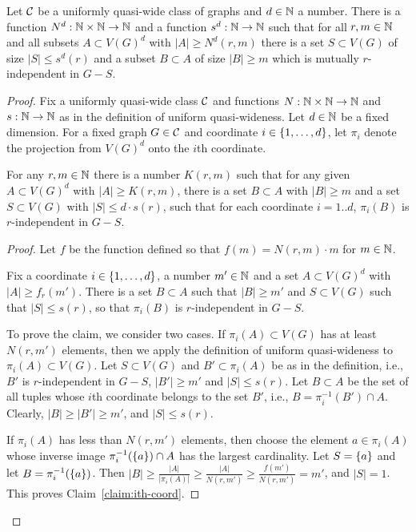 \begin{proposition}\label{prop:uqw-tuples}
	Let $\cal C$ be a uniformly quasi-wide class of graphs and $d\in\N$ a number.
	There is a  function $N^d:\N\times\N\to\N$ and a function $s^d:\N\to\N$
	such that for all $r,m\in\N$ and all subsets $A\subset V(G)^d$
	with $|A|\ge N^d(r,m)$ there  is a set $S\subset V(G)$
	of size $|S|\le s^d(r)$ and a subset $B\subset A$ of size $|B|\ge m$ which is mutually $r$-independent in $G-S$.
\end{proposition}
\begin{proof}Fix a uniformly quasi-wide class $\cal C$ and functions $N:\N\times\N\to \N$
	and $s:\N\to\N$ as in the definition of uniform quasi-wideness.
	Let $d\in \N$ be a fixed dimension.
		For a fixed graph $G\in \cal C$  and
	  coordinate $i\in\set{1,\ldots,d}$, let $\pi_i$ denote the projection from $V(G)^d$ onto the $i$th coordinate.

	


\begin{lemma}\label{lem:step1} For any $r,m\in \N$ there is a number $K(r,m)$ such that
	for any given $A\subset V(G)^d$ with $|A|\ge K(r,m)$,
	there is a set $B\subset A$ with $|B|\ge m$ and a set $S\subset V(G)$ with $|S|\le d\cdot s(r)$, 
	such that for each coordinate $i=1..d$, 
 $\pi_i(B)$ is $r$-independent in $G-S$. 
\end{lemma}
\begin{proof}

Let $f$ be the function defined so that $f(m)=N(r,m)\cdot m$ for $m\in\N$.

\begin{claim}\label{claim:ith-coord}
Fix a coordinate $i\in\set{1,\ldots,d}$, a number $m'\in\N$ and a  set $A\subset V(G)^d$ with  $|A|\ge f_r(m')$.
There is a set $B\subset A$ such that $|B|\ge m'$
and $S\subset V(G)$ such that $|S|\le  s(r)$,
so that  $\pi_i(B)$ is $r$-independent in $G-S$.	
\end{claim}
To prove the claim, 
we consider two cases.
If $\pi_i(A)\subset V(G)$ has at least $N(r,m')$ elements, then we apply the definition of uniform quasi-wideness to $\pi_i(A)\subset V(G)$. Let $S\subset V(G)$ and $B'\subset \pi_i(A)$
be as in the definition, i.e., $B'$ is $r$-independent in $G-S$,
$|B'|\ge m'$ and $|S|\le s(r)$. Let $B\subset A$ be the set of all tuples 
whose $i$th coordinate belongs to the set $B'$, i.e., $B=\pi_i^{-1}(B')\cap A$.
Clearly, $|B|\ge |B'|\ge m'$, and $|S|\le s(r)$.

If $\pi_i(A)$ has less than $N(r,m')$ elements, then choose the element $a\in\pi_i(A)$ whose inverse image $\pi_i^{-1}(\set a)\cap A$ has the largest cardinality. Let $S=\set{a}$ 
and let $B=\pi_i^{-1}(\set a)$. Then $|B|\ge \frac{|A|}{|\pi_i(A)|}\ge \frac{|A|}{N(r,m')}\ge \frac {f(m')}{N(r,m')}=m'$,
and $|S|=1$. This proves Claim~\ref{claim:ith-coord}.



\end{proof}
\end{proof}
